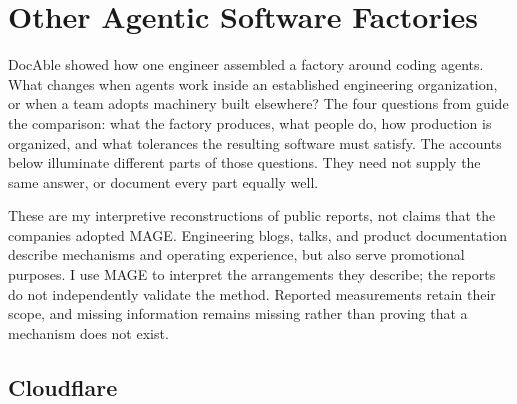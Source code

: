 


\chapter{Other Agentic Software Factories}


DocAble showed how one engineer assembled a factory around coding agents. What changes when agents work inside an established engineering organization, or when a team adopts machinery built elsewhere? The four questions from  guide the comparison: what the factory produces, what people do, how production is organized, and what tolerances the resulting software must satisfy. The accounts below illuminate different parts of those questions. They need not supply the same answer, or document every part equally well.


These are my interpretive reconstructions of public reports, not claims that the companies adopted MAGE. Engineering blogs, talks, and product documentation describe mechanisms and operating experience, but also serve promotional purposes. I use MAGE to interpret the arrangements they describe; the reports do not independently validate the method. Reported measurements retain their scope, and missing information remains missing rather than proving that a mechanism does not exist.

\section{Cloudflare}\label{heading:cloudflare}

